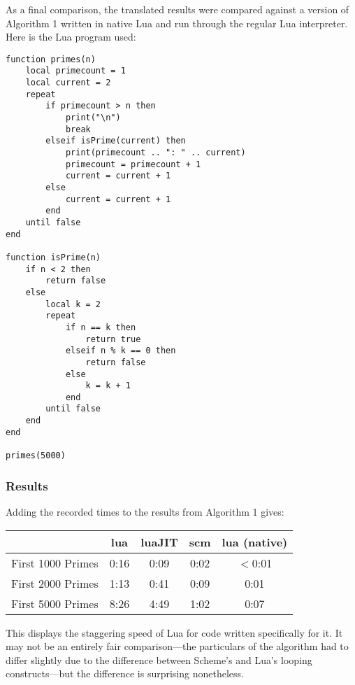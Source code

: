 As a final comparison, the translated results were compared against a version of
Algorithm 1 written in native Lua and run through the regular Lua interpreter.
Here is the Lua program used:

\begin{framed}
\begin{verbatim}
function primes(n)
    local primecount = 1
    local current = 2
    repeat
        if primecount > n then
            print("\n")
            break
        elseif isPrime(current) then
            print(primecount .. ": " .. current)
            primecount = primecount + 1
            current = current + 1
        else
            current = current + 1
        end
    until false
end

function isPrime(n)
    if n < 2 then
        return false
    else
        local k = 2
        repeat
            if n == k then
                return true
            elseif n % k == 0 then
                return false
            else
                k = k + 1
            end
        until false
    end
end

primes(5000)
\end{verbatim}
\end{framed}

\subsubsection{Results}

Adding the recorded times to the results from Algorithm 1 gives:
\begin{center}
\begin{tabular}{|l|c|c|c|c|}
\hline
& lua & luaJIT & scm & lua (native) \\
\hline
First 1000 Primes & 0:16 & 0:09 & 0:02 & $<$0:01 \\ \hline
First 2000 Primes & 1:13 & 0:41 & 0:09 & 0:01 \\ \hline
First 5000 Primes & 8:26 & 4:49 & 1:02 & 0:07 \\ \hline
\end{tabular}
\end{center}
This displays the staggering speed of Lua for code written specifically for it.
It may not be an entirely fair comparison---the particulars of the algorithm
had to differ slightly due to the difference between Scheme's and Lua's looping
constructs---but the difference is surprising nonetheless.
